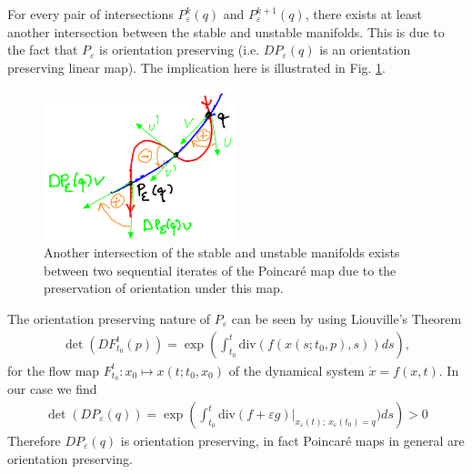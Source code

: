 \begin{remark}[]
	For every pair of intersections $P_{\varepsilon}^{k}(q)$ and $P _{\varepsilon}^{k+1}(q)$, there exists at least another intersection between the stable and unstable manifolds. This is due to the fact that $P_{\varepsilon}$ is orientation preserving (i.e. $DP_{\varepsilon}(q)$ is an orientation preserving linear map). The implication here is illustrated in Fig. \ref{fig:between_intersections}.
\begin{figure}[h!]
	\centering
	\includegraphics[width=0.5\textwidth]{figures/ch6/13between_intersections.png}
	\caption{Another intersection of the stable and unstable manifolds exists between two sequential iterates of the Poincaré map due to the preservation of orientation under this map.}
	\label{fig:between_intersections}
\end{figure}

The orientation preserving nature of $P_{\varepsilon}$ can be seen by using Liouville's Theorem 
	\begin{align}
		\det(DF_{t_0}^{t}(p)) = \exp \left( \int_{t_0}^{t}  \textrm{div}  ( f(x(s;t_0,p),s))ds\right),
	\end{align}
	for the flow map $F_{t_0}^{t}:x_0 \mapsto x(t;t_0,x_0)$	of the dynamical system $\dot{x} = f(x,t)$. In our case we find
	\begin{align}
		\det (DP_{\varepsilon}(q)) = \exp\left(\int_{t_0}^{t}  \textrm{div} \left. (f + \varepsilon g) \right|_{x_{\varepsilon}(t);\ x_{\varepsilon}(t_0)=q}) ds \right) > 0
	\end{align}
	Therefore $DP_{\varepsilon}(q)$ is orientation preserving, in fact Poincaré maps in general are orientation preserving.	
\end{remark}

